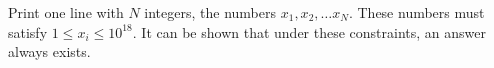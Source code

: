 

Print one line with $N$ integers, the numbers $x_1, x_2, \dots x_N$. These numbers must 
satisfy $1 \leq x_i \leq 10^{18}$. It can be shown that under these constraints, an answer
always exists.
